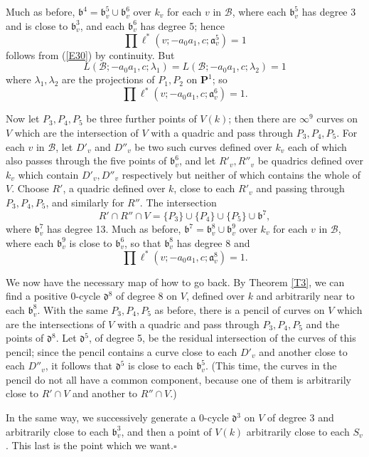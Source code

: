 \documentclass[12pt]{article}
\def\bP{{\mathbf P}}
\def\fa{{\mathfrak a}}
\def\fb{{\mathfrak b}}
\def\fd{{\mathfrak d}}
\def\gl{{\lambda}}
\def\sB{{\mathcal B}}
\def\qed{{\hfill$\square$}}
\begin{document}
Much as before, $\fb^4=\fb^5_v\cup\fb^6_v$ over $k_v$ for each $v$ in $\sB$,
where each $\fb^5_v$ has degree 3 and is close to $\fb^3_v$, and each $\fb^6_v$
has degree 5; hence
\[ \prod\ell^*(v;-a_0a_1,c;\fa^5_v)=1 \]
follows from (\ref{E30}) by continuity. But
\[ L(\sB;-a_0a_1,c;\gl_1)=L(\sB;-a_0a_1,c;\gl_2)=1 \]
where $\gl_1,\gl_2$ are the projections of $P_1,P_2$ on $\bP^1$; so
\[ \prod\ell^*(v;-a_0a_1,c;\fa^6_v)=1. \]

Now let $P_3,P_4,P_5$ be three further points of $V(k)$; then there are
$\infty^9$ curves on $V$ which are the intersection of $V$ with a quadric and
pass through $P_3,P_4,P_5$. For each $v$ in $\sB$, let $D'_v$ and $D''_v$ be
two such curves defined over $k_v$ each of which also passes through the five
points of $\fb^6_v$, and let $R'_v,R''_v$ be quadrics defined over $k_v$
which contain $D'_v,D''_v$ respectively but neither of which contains the whole
of $V$. Choose $R'$, a quadric defined over $k$, close to each $R'_v$ and
passing through $P_3,P_4,P_5$, and similarly for $R''$. The intersection
\[ R'\cap R''\cap V=\{P_3\}\cup\{P_4\}\cup\{P_5\}\cup\fb^7, \]
where $\fb^7_v$ has degree 13.
Much as before, $\fb^7=\fb^8_v\cup\fb^9_v$ over $k_v$ for each $v$ in
$\sB$, where each $\fb^9_v$ is close to $\fb^6_v$, so that $\fb^8_v$ has degree
8 and
\[ \prod\ell^*(v;-a_0a_1,c;\fa^8_v)=1. \]

We now have the necessary map of how to go back.
By Theorem \ref{T3}, we can find a
positive 0-cycle $\fd^8$ of degree 8 on $V$, defined over $k$ and
arbitrarily near to each $\fb^8_v$. With the same $P_3,P_4,P_5$ as before,
there is a pencil of curves on $V$ which are the intersections of $V$ with a
quadric and pass through $P_3,P_4,P_5$ and the points of $\fd^8$. Let
$\fd^5$, of degree 5,
be the residual intersection of the curves of this pencil; since the
pencil contains a curve close to each $D'_v$ and another close to each
$D''_v$, it follows that $\fd^5$ is close to each $\fb^5_v$.
(This time, the curves in the pencil do not all have a common component,
because one of them is arbitrarily close to $R'\cap V$ and another to
$R''\cap V$.)

In the same way, we successively generate a 0-cycle $\fd^3$ on $V$ of degree 3
and arbitrarily close to each $\fb^3_v$, and then a point of $V(k)$ arbitrarily
close to each $S_v$. This last is the point which we want.\qed


\medskip
\end{document}
